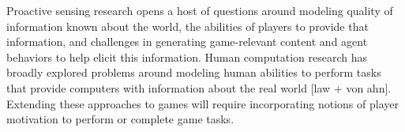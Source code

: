 \documentclass[conference]{IEEEtran}
\begin{document}
Proactive sensing research opens a host of questions around modeling quality of information known about the world, the abilities of players to provide that information, and challenges in generating game-relevant content and agent behaviors to help elicit this information. 
Human computation research has broadly explored problems around modeling human abilities to perform tasks that provide computers with information about the real world [law + von ahn]. 
Extending these approaches to games will require incorporating notions of player motivation to perform or complete game tasks.




\end{document}
